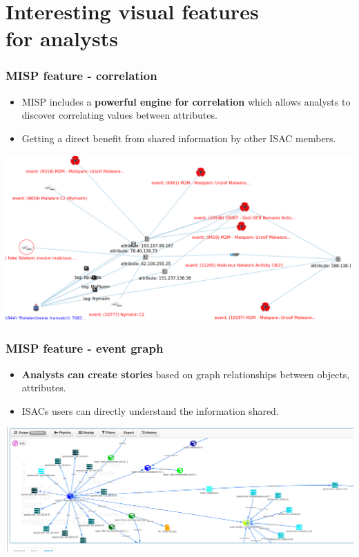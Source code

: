 \section{Interesting visual features \\ for analysts}

\begin{frame}
    \frametitle{MISP feature - correlation}
    \begin{itemize}
        \item MISP includes a {\bf powerful engine for correlation} which allows analysts to discover correlating values between attributes. 
        \item Getting a direct benefit from shared information by other ISAC members.
    \end{itemize}
    \includegraphics[scale=0.20]{../images/correlation.png}
\end{frame}

\begin{frame}
    \frametitle{MISP feature - event graph}
    \begin{itemize}
        \item {\bf Analysts can create stories} based on graph relationships between objects, attributes.
         \item ISACs users can directly understand the information shared.
    \end{itemize}
    \includegraphics[scale=0.20]{../images/event-graph.png}
\end{frame}

